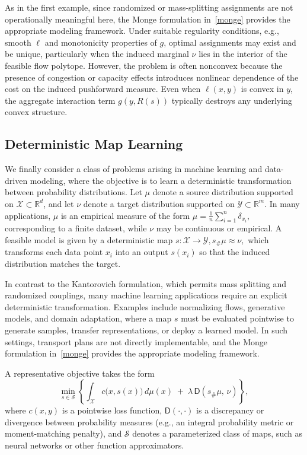 \documentclass[12pt,leqno]{amsart}
\begin{document}
As in the first example, since randomized or mass-splitting assignments are not operationally meaningful here, the Monge formulation in~\eqref{monge} provides the appropriate modeling framework. Under suitable regularity conditions, e.g., smooth $\ell$ and monotonicity properties of $g$, optimal assignments may exist and be unique, particularly when the induced marginal $\nu$ lies in the interior of the feasible flow polytope. However, the problem is often nonconvex because the presence of congestion or capacity effects introduces nonlinear dependence of the cost on the induced pushforward measure. Even when $\ell(x,y)$ is convex in $y$, the aggregate interaction term $g(y,R(s))$ typically destroys any underlying convex structure.

\subsection{Deterministic Map Learning}
\label{sec:ml_monge_example}

We finally consider a class of problems arising in machine learning and data-driven modeling, where the objective is to learn a deterministic transformation between probability distributions. Let $\mu$ denote a source distribution supported on $\mathcal{X} \subset \mathbb R^d$, and let $\nu$ denote a target distribution supported on $\mathcal{Y} \subset \mathbb R^m$. In many applications, $\mu$ is an empirical measure of the form 
$\mu = \frac{1}{n}\sum_{i=1}^n \delta_{x_i},$
corresponding to a finite dataset, while $\nu$ may be continuous or empirical. A feasible model is given by a deterministic map $s : \mathcal{X} \to \mathcal{Y}, s_\# \mu \approx \nu,$
which transforms each data point $x_i$ into an output $s(x_i)$ so that the induced distribution matches the target.

In contrast to the Kantorovich formulation, which permits mass splitting and randomized couplings, many machine learning applications require an explicit deterministic transformation. Examples include normalizing flows, generative models, and domain adaptation, where a map $s$ must be evaluated pointwise to generate samples, transfer representations, or deploy a learned model. In such settings, transport plans are not directly implementable, and the Monge formulation in~\eqref{monge} provides the appropriate modeling framework.

A representative objective takes the form
\begin{equation}
\label{eq:ml_cost}
\min_{s \in \mathcal{S}}
\left\{
\int_{\mathcal{X}} c\bigl(x,s(x)\bigr)\,d\mu(x)
\;+\;
\lambda\,\mathsf D\!\left(s_\#\mu,\,\nu\right)
\right\},
\end{equation}
where $c(x,y)$ is a pointwise loss function, $\mathsf D(\cdot,\cdot)$ is a discrepancy or divergence between probability measures (e.g., an integral probability metric or moment-matching penalty), and $\mathcal{S}$ denotes a parameterized class of maps, such as neural networks or other function approximators.
\end{document}
